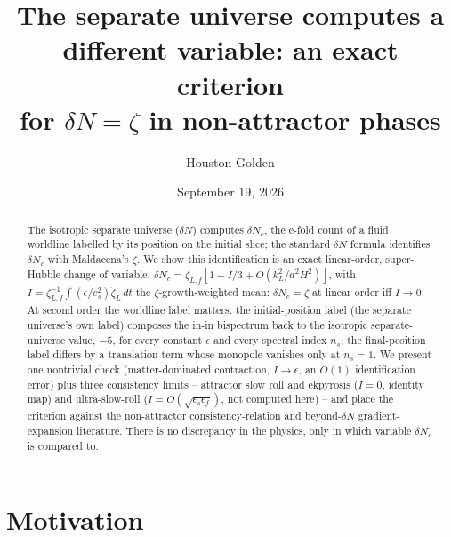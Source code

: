 \documentclass[aps,prd,twocolumn,superscriptaddress,showpacs,preprintnumbers,nofootinbib,longbibliography,floatfix]{revtex4-2}
\newcommand{\eps}{\epsilon}
\newcommand{\paperVersion}{v1S.0.12}
\newcommand{\paperTimestamp}{September 19, 2026}
\begin{document}
\preprint{\paperVersion}

\title{The separate universe computes a different variable: an exact criterion\\
for $\delta N=\zeta$ in non-attractor phases}

\author{Houston Golden}

\date{\paperTimestamp}

\begin{abstract}
The isotropic separate universe ($\delta N$) computes $\delta N_c$, the e-fold count of a
fluid worldline labelled by its position on the initial slice; the standard $\delta N$
formula identifies $\delta N_c$ with Maldacena's $\zeta$. We show this identification is an
exact linear-order, super-Hubble change of variable,
$\delta N_c=\zeta_{L,f}[1-I/3+O(k_L^2/a^2H^2)]$, with
$I=\zeta_{L,f}^{-1}\int(\eps/c_s^2)\dot\zeta_L\,dt$ the $\zeta$-growth-weighted mean:
$\delta N_c=\zeta$ at linear order iff $I\to0$. At second order the worldline label matters:
the initial-position label (the separate universe's own label) composes the in-in
bispectrum back to the isotropic separate-universe value, $-5$, for every constant $\eps$
and every spectral index $n_s$; the final-position label differs by a translation term whose
monopole vanishes only at $n_s=1$. We present one
nontrivial check (matter-dominated contraction, $I\to\eps$, an $O(1)$ identification error)
plus three consistency limits -- attractor slow roll and ekpyrosis ($I=0$, identity map)
and ultra-slow-roll ($I=O(\sqrt{\eps_s\eps_f})$, not computed here) -- and place the
criterion against the non-attractor consistency-relation and beyond-$\delta N$
gradient-expansion literature. There is no discrepancy in the physics, only in which
variable $\delta N_c$ is compared to.
\end{abstract}

\maketitle

\section{Motivation}
\end{document}
